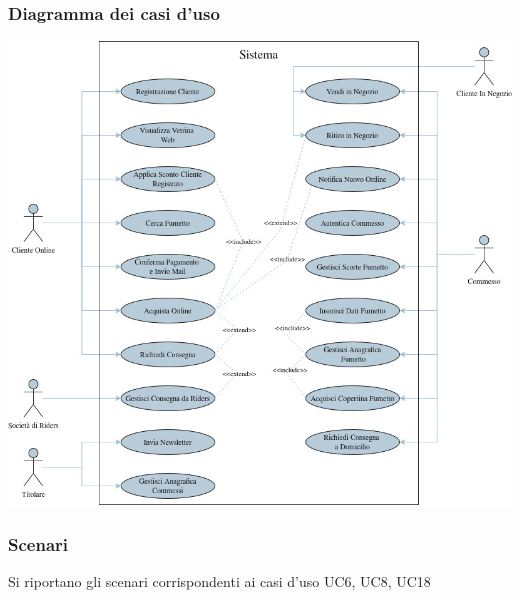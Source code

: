 \documentclass[12pt, a4paper]{article}
\begin{document}
\subsubsection{Diagramma dei casi d'uso}
\begin{center}
  \includegraphics[scale=0.58]{./public/usecasediagram.jpg}
\end{center}
\newpage

\subsubsection{Scenari}
Si riportano gli scenari corrispondenti ai casi d'uso UC6, UC8, UC18
\end{document}
